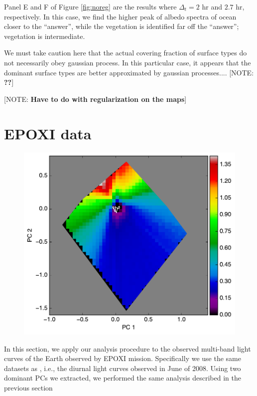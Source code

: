 \documentclass[iop,numberedappendix,apj,]{emulateapj}
\def\memoYF#1{\color{red}[NOTE: {\bf #1}]\color{black}}
\begin{document}
Panel E and F of Figure \ref{fig:noreg} are the results where $\Delta_ t = 2$ hr and $2.7$ hr, respectively. 
In this case, we find the higher peak of albedo spectra of ocean closer to the ``answer'', while the vegetation is identified far off the ``answer''; vegetation is intermediate. 

We must take caution here that the actual covering fraction of surface types do not necessarily obey gaussian process. 
In this particular case, it appears that the dominant surface types are better approximated by gaussian processes.... \memoYF{??}


\memoYF{Have to do with regularization on the maps}


\section{EPOXI data}
\label{s:EPOXI}

\begin{figure}[tbh!]
    \begin{center}
	\includegraphics[width=\hsize]{raddata_2_PCplane_noreg.pdf}
    \end{center}
    \caption{}
\label{fig:EPOXI}
\end{figure}


In this section, we apply our analysis procedure to the observed multi-band light curves of the Earth observed by EPOXI mission. 
Specifically we use the same datasets as \citet{Cowan2013}, i.e., the diurnal light curves observed in June of 2008. 
Using two dominant PCs we extracted, we performed the same analysis described in the previous section 
\end{document}
